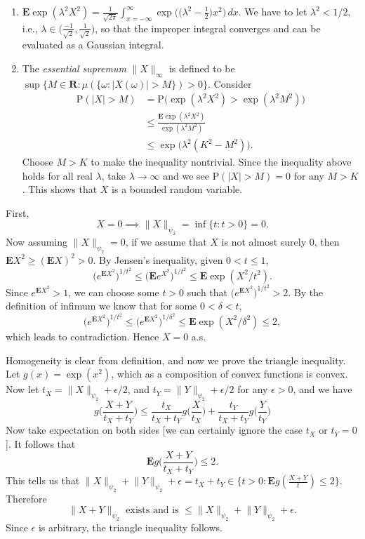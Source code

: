 \documentclass[11pt]{article}
\newcommand{\R}{\mathbf{R}}
\newcommand{\nm}[1]{\lVert #1 \rVert}
\newcommand{\abs}[1]{\lvert #1 \rvert}
\renewcommand{\Pr}{\mathrm{P}}
\newcommand{\E}{\mathbf{E}}
\newcommand{\df}[1]{\textit{\textsf{#1}}} %
\theoremstyle{plain}
\theoremstyle{definition}
\theoremstyle{remark}
\theoremstyle{definition}
\newenvironment{mansol}[1]{%
  \renewcommand\themansolinner{#1}%
  \mansolinner
}{\endmansolinner}
\begin{document}
\begin{mansol}{2.5.5}
    \begin{enumerate}[label=(\alph*)]
        \item $\E \exp(\lambda^2 X^2) = \frac{1}{\sqrt{2\pi}}\int_{x = -\infty}^\infty \exp\bigl(\bigl(\lambda^2 -\frac 1 2\bigr) x^2\bigr)\,dx$. We have to let $\lambda^2 < 1/2$, i.e., $\lambda \in \bigl(\frac{-1}{\sqrt{2}}, \frac{1}{\sqrt{2}}\bigr)$, so that the improper integral converges and can be evaluated as a Gaussian integral.
        \item The \df{essential supremum} $\nm{X}_\infty$ is defined to be $\sup\{M \in \R : \mu(\{\omega : \abs{X(\omega)} > M\}) > 0\}$. Consider \begin{align*}
            \Pr (\abs{X} > M) & = \Pr\bigl(\exp(\lambda^2 X^2) > \exp(\lambda^2 M^2)\bigr) \\
            & \leq \frac{\E \exp(\lambda^2 X^2)}{\exp(\lambda^2 M^2)} \\
            & \leq \exp\bigl(\lambda^2(K^2 - M^2)\bigr).
        \end{align*}
        Choose $M > K$ to make the inequality nontrivial. Since the inequality above holds for all real $\lambda$, take $\lambda \to \infty$ and we see $\Pr(\abs{X} > M) = 0$ for any $M > K$. This shows that $X$ is a bounded random variable.
    \end{enumerate}
\end{mansol}

\begin{mansol}{2.5.7}
    First, \[X = 0 \implies \nm{X}_{\psi_2} = \inf\{t:t>0\} = 0.\] Now assuming $\nm{X}_{\psi_2} = 0$, if we assume that $X$ is not almost surely 0, then $\E X^2 \geq (\E X)^2 > 0$. By Jensen's inequality, given $0<t\leq 1$, \[
    \bigl(e^{\E X^2}\bigr)^{1/t^2} \leq \bigl(\E e^{X^2}\bigr)^{1/t^2} \leq \E \exp(X^2 / t^2).
    \]
    Since $e^{\E X^2} > 1$, we can choose some $t > 0$ such that $\bigl(e^{\E X^2}\bigr)^{1/t^2} > 2$. By the definition of infimum we know that for some $0 < \delta < t$, \[
         \bigl(e^{\E X^2}\bigr)^{1/t^2} \leq \bigl(e^{\E X^2}\bigr)^{1/\delta^2} \leq \E \exp(X^2 / \delta^2) \leq 2,
    \]
    which leads to contradiction. Hence $X = 0$ a.s.

    Homogeneity is clear from definition, and now we prove the triangle inequality. Let $g(x) = \exp(x^2)$, which as a composition of convex functions is convex. Now let $t_X = \nm{X}_{\psi_2} + \epsilon/2$, and $t_Y = \nm{Y}_{\psi_2} + \epsilon/2$ for any $\epsilon > 0$, and we have \[
        g \biggl(\frac{X+Y}{t_X + t_Y}\biggr) \leq \frac{t_X}{t_X + t_Y} g\biggl(\frac{X}{t_X}\biggr) + \frac{t_Y}{t_X + t_Y} g\biggl(\frac{Y}{t_Y}\biggr)
    \]
    Now take expectation on both sides [we can certainly ignore the case $t_X$ or $t_Y = 0$]. It follows that \[\E g \biggl(\frac{X+Y}{t_X + t_Y}\biggr) \leq 2.\]
    This tells us that $\nm{X}_{\psi_2} + \nm{Y}_{\psi_2} + \epsilon = t_X + t_Y \in \{t>0 : \E g(\frac{X+Y}{t}) \leq 2\}$. Therefore \[
        \nm{X+Y}_{\psi_2} \text{ exists and is } \leq \nm{X}_{\psi_2} + \nm{Y}_{\psi_2} + \epsilon.
    \]
    Since $\epsilon$ is arbitrary, the triangle inequality follows.
\end{mansol}
\end{document}
